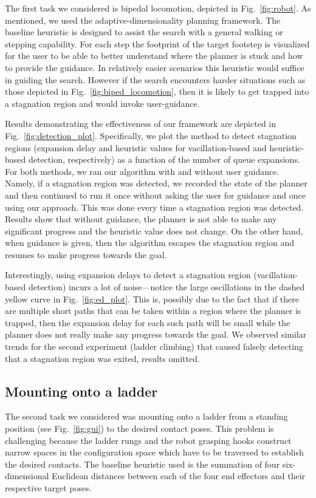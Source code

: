 \documentclass{article}
\begin{document}
The first task we considered is bipedal locomotion, depicted in Fig.~\ref{fig:robot}.
As mentioned, we used the adaptive-dimensionality  planning framework. The baseline heuristic is designed to assist the search with a general walking or stepping capability. For each step the footprint of the target footstep is visualized for the user to be able to better understand where the planner is stuck and how to provide the guidance. In relatively easier scenarios this heuristic would suffice in guiding the search. However if the search encounters harder situations such as those depicted in Fig.~\ref{fig:biped_locomotion}, then it is likely to get trapped into a stagnation region and would invoke user-guidance.

Results demonstrating the effectiveness of our framework are depicted in Fig.~\ref{fig:detection_plot}.
Specifically, we plot the 
method to detect stagnation regions (expansion delay and heuristic values for vacillation-based and heuristic-based detection, respectively) as a function of the number of queue expansions.
For both methods, we ran our algorithm with and without user guidance.
Namely, if a stagnation region was detected, we recorded the state of the planner and then continued to run it once without asking the user for guidance and once using our approach. This was done every time a stagnation region was detected. 
Results show that without guidance, the planner is not able to make any significant progress and the heuristic value does not change.
On the other hand, when guidance is given, then the algorithm escapes the stagnation region and resumes to make progress towards the goal.

Interestingly, using expansion delays to detect a stagnation region (vacillation-based detection) incurs a lot of noise---notice the large oscillations in the dashed yellow curve in Fig.~\ref{fig:ed_plot}. 
This is, possibly due to the fact that if there are multiple short paths that can be taken within a region where the planner is trapped, then the expansion delay for each such path will be small while the planner does not really make any progress towards the goal.
We observed similar trends for the second experiment (ladder climbing) that caused falsely detecting that a stagnation region was exited, results omitted.


\subsection{Mounting onto a ladder}
The second task we considered was mounting onto a ladder from a standing position (see Fig.~\ref{fig:gui}) to the desired contact poses. This problem is challenging because the ladder rungs and the robot grasping hooks construct narrow spaces in the configuration space which have to be traversed to establish the desired contacts. The baseline heuristic  used is the summation of four six-dimensional Euclidean distances between each of the four end effectors and their respective target poses. 
\end{document}
